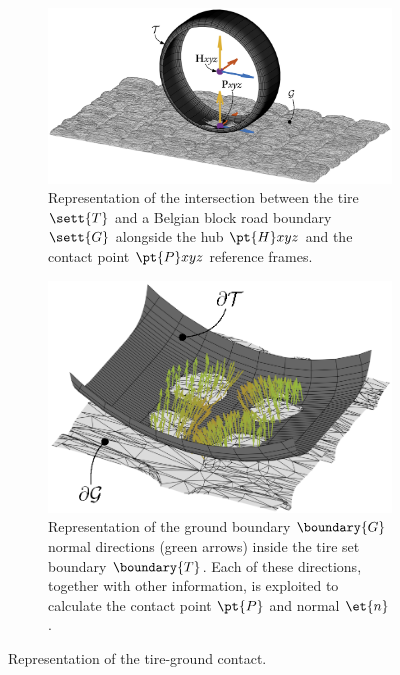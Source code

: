 \begin{figure}[htb]
  \begin{subfigure}[t]{0.475\textwidth}
    \centering
    \includegraphics[width=1.0\textwidth, trim={5cm 2.3cm 5cm 0cm}, clip]{./figures/appendix_2/road_shell_ipe}
    \caption{Representation of the intersection between the tire $\sett{T}$ and a Belgian block road boundary $\sett{G}$ alongside the hub $\pt{H}xyz$ and the contact point $\pt{P}xyz$ reference frames.}
    \label{app2:fig:tire_shell}
  \end{subfigure}
  \hfill%
  \begin{subfigure}[t]{0.475\textwidth}
    \centering
    \includegraphics[width=1.0\textwidth]{./figures/appendix_2/zoom_ipe}
    \caption{Representation of the ground boundary $\boundary{G}$ normal directions (green arrows) inside the tire set boundary $\boundary{T}$. Each of these directions, together with other information, is exploited to calculate the contact point $\pt{P}$ and normal $\et{n}$.}
    \label{app2:fig:zoom}
  \end{subfigure}
  \caption{Representation of the tire-ground contact.}
  \label{app2:fig:tire_ground}
\end{figure}

